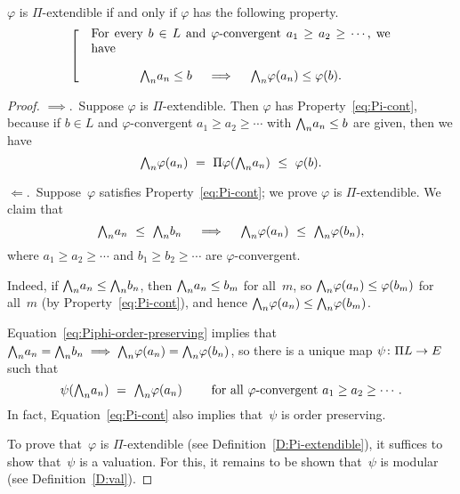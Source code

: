 \documentclass[main.tex]{subfiles}
\begin{document}
\begin{lem}
$\varphi$ is $\Pi$-extendible
if and only if  $\varphi$
has the following property.
\begin{equation}
\label{eq:Pi-cont}
\left[ \quad
\begin{minipage}{.7\columnwidth}
For every $b\in L$ and $\varphi$-convergent 
 $a_1 \geq a_2 \geq \dotsb$,
we have
\begin{equation*}
\bw_n a_n \leq b
\quad\implies\quad
\bw_n \varphi (a_n) \leq \varphi(b).
\end{equation*}
\end{minipage}
\right.
\end{equation}
\end{lem}
\begin{proof}
$\implies$.\ 
Suppose $\varphi$ is $\Pi$-extendible.
Then $\varphi$ has Property~\eqref{eq:Pi-cont},
because if $b\in L$ and $\varphi$-convergent $a_1 \geq a_2 \geq \dotsb$
with $\textstyle{\bigwedge}_n a_n \leq b$ are given,
then we have
\begin{equation*}
\bw_n \varphi(a_n) 
\ =\ 
\Pi\varphi(\bw_n a_n)
\ \leq\ 
\varphi(b).
\end{equation*}

\noindent$\Longleftarrow$.\ 
Suppose~$\varphi$ satisfies Property~\eqref{eq:Pi-cont};
we prove $\varphi$ is $\Pi$-extendible.
We claim that
\begin{equation}
\label{eq:Piphi-order-preserving}
\textstyle{\bigwedge}_n a_n \ \leq\ \textstyle{\bigwedge}_n b_n 
\quad\implies\quad
\textstyle{\bigwedge}_n \varphi(a_n) \ \leq\ \textstyle{\bigwedge}_n \varphi(b_n),
\end{equation}
where $a_1 \geq a_2 \geq \dotsb$ and $b_1 \geq b_2 \geq \dotsb$
are $\varphi$-convergent.

Indeed,
if $\textstyle{\bigwedge}_n a_n \leq \textstyle{\bigwedge}_n b_n$,
then $\textstyle{\bigwedge}_n a_n \leq b_m$ for all~$m$,
so $\textstyle{\bigwedge}_n \varphi(a_n) \leq \varphi(b_m)$ for all~$m$
(by Property~\ref{eq:Pi-cont}),
and hence $\textstyle{\bigwedge}_n \varphi(a_n) \leq \textstyle{\bigwedge}_n \varphi(b_m)$.

Equation~\eqref{eq:Piphi-order-preserving} implies that
 $\textstyle{\bigwedge}_n a_n = \textstyle{\bigwedge}_n b_n \implies \textstyle{\bigwedge}_n\varphi(a_n) = \textstyle{\bigwedge}_n \varphi(b_n)$,
so there is a unique map $\psi\colon \Pi L \rightarrow E$ such that
\begin{equation*}
\psi(\textstyle{\bigwedge}_n a_n) \ =\ \textstyle{\bigwedge}_n \varphi(a_n)
\qquad
\text{ for all $\varphi$-convergent }a_1 \geq a_2 \geq \dotsb.
\end{equation*}
In fact, 
Equation~\eqref{eq:Pi-cont}
also implies that~$\psi$ is order preserving.

To prove that~$\varphi$ is $\Pi$-extendible
(see Definition~\ref{D:Pi-extendible}),
it suffices to show that~$\psi$ is a valuation.
For this,
it remains to be shown that~$\psi$ is modular
(see Definition~\ref{D:val}).


\end{proof}
\end{document}
